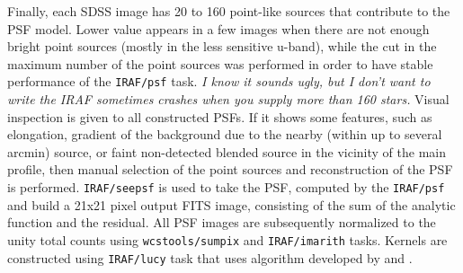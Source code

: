 \documentclass[numberedappendix,apj,twocolumn]{emulateapj}
\begin{document}
Finally, each SDSS image has 20 to 160 point-like sources that contribute to the PSF model. Lower value appears in a few images when there are not enough bright point sources (mostly in the less sensitive u-band), while the cut in the maximum number of the point sources was performed in order to have stable performance of the {\tt IRAF/psf} task. \textit{I know it sounds ugly, but I don't want to write the IRAF sometimes  crashes when you supply more than 160 stars.} Visual inspection is given to all constructed PSFs. If it shows some features, such as elongation, gradient of the background due to the nearby (within up to several arcmin) source, or faint non-detected blended source in the vicinity of the main profile, then manual selection of the point sources and reconstruction of the PSF is performed. {\tt IRAF/seepsf} is used to take the PSF, computed by the {\tt IRAF/psf} and build a 21x21 pixel output FITS image, consisting of the sum of the analytic function and the residual. All PSF images are subsequently normalized to the unity total counts using {\tt wcstools/sumpix} \citep{Mink1998b} and {\tt IRAF/imarith} tasks. Kernels are constructed using {\tt IRAF/lucy} task that uses algorithm developed by \citet{Lucy1974} and \citet{Richardson1972}.
\end{document}
